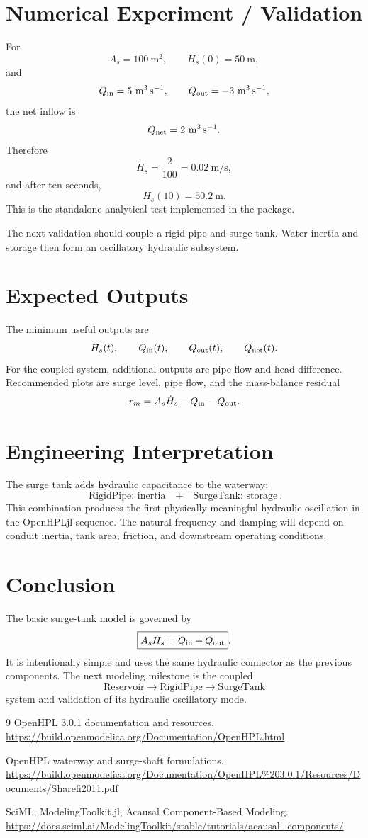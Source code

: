 \documentclass[11pt,a4paper]{article}
\begin{document}
\section{Numerical Experiment / Validation}
For
\[
A_s=100~\si{\meter\squared},\qquad
H_s(0)=50~\si{\meter},
\]
and
\[
Q_{\rm in}=5~\si{\meter\cubed\per\second},\qquad
Q_{\rm out}=-3~\si{\meter\cubed\per\second},
\]
the net inflow is
\[
Q_{\rm net}=2~\si{\meter\cubed\per\second}.
\]
Therefore
\[
\dot H_s=\frac{2}{100}=0.02~\si{\meter\per\second},
\]
and after ten seconds,
\[
\boxed{H_s(10)=50.2~\si{\meter}}.
\]
This is the standalone analytical test implemented in the package.

The next validation should couple a rigid pipe and surge tank. Water inertia and storage then form an oscillatory hydraulic subsystem.

\section{Expected Outputs}
The minimum useful outputs are
\[
H_s(t),\qquad Q_{\rm in}(t),\qquad Q_{\rm out}(t),\qquad Q_{\rm net}(t).
\]
For the coupled system, additional outputs are pipe flow and head difference. Recommended plots are surge level, pipe flow, and the mass-balance residual
\[
r_m=A_s\dot H_s-Q_{\rm in}-Q_{\rm out}.
\]

\section{Engineering Interpretation}
The surge tank adds hydraulic capacitance to the waterway:
\[
\boxed{\text{RigidPipe: inertia}\quad+\quad\text{SurgeTank: storage}}.
\]
This combination produces the first physically meaningful hydraulic oscillation in the OpenHPLjl sequence. The natural frequency and damping will depend on conduit inertia, tank area, friction, and downstream operating conditions.

\section*{Conclusion}
The basic surge-tank model is governed by
\[
\boxed{A_s\dot H_s=Q_{\rm in}+Q_{\rm out}}.
\]
It is intentionally simple and uses the same hydraulic connector as the previous components. The next modeling milestone is the coupled
\[
\boxed{\text{Reservoir}\rightarrow\text{RigidPipe}\rightarrow\text{SurgeTank}}
\]
system and validation of its hydraulic oscillatory mode.

\begin{thebibliography}{9}
OpenHPL 3.0.1 documentation and resources.\newline
\url{https://build.openmodelica.org/Documentation/OpenHPL.html}

OpenHPL waterway and surge-shaft formulations.\newline
\url{https://build.openmodelica.org/Documentation/OpenHPL%203.0.1/Resources/Documents/Sharefi2011.pdf}

SciML, ModelingToolkit.jl, Acausal Component-Based Modeling.\newline
\url{https://docs.sciml.ai/ModelingToolkit/stable/tutorials/acausal_components/}
\end{thebibliography}
\end{document}
